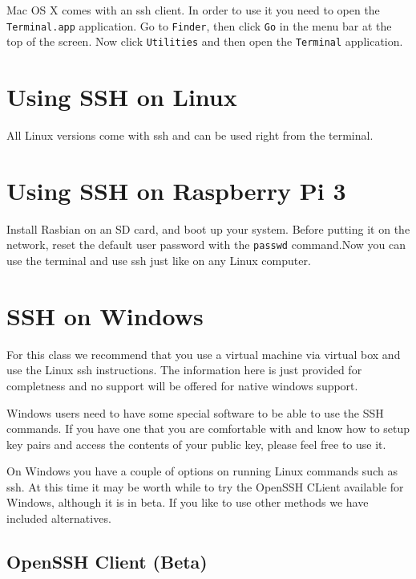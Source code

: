 Mac OS X comes with an ssh client. In order to use it you need to open
the \texttt{Terminal.app} application. Go to \texttt{Finder}, then click
\texttt{Go} in the menu bar at the top of the screen. Now click
\texttt{Utilities} and then open the \texttt{Terminal} application.


\section{Using SSH on Linux}\label{using-ssh-on-mac-os-x}

All Linux versions come with ssh and can be used right from the terminal.

\section{Using SSH on Raspberry Pi 3}\label{using-ssh-on-mac-os-x}

Install Rasbian on an SD card, and boot up your system. Before putting
it on the network, reset the default user password with the
\verb|passwd| command.Now you can use the terminal and use ssh just
like on any Linux computer.



\section{SSH on Windows}

\begin{WARNING}
For this class we recommend that you use a virtual
machine via virtual box and use the Linux ssh instructions. The
information here is just provided for completness and no support will be
offered for native windows support.
\end{WARNING}

Windows users need to have some special software to be able to use the
SSH commands. If you have one that you are comfortable with and know how
to setup key pairs and access the contents of your public key, please
feel free to use it.

On Windows you have a couple of options on running Linux commands such
as ssh. At this time it may be worth while to try the OpenSSH CLient
available for Windows, although it is in beta. If you like to use
other methods we have included alternatives.

\subsection{OpenSSH Client (Beta)}

